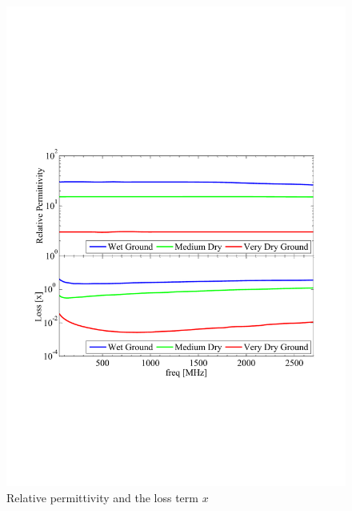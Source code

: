 \documentclass[10pt,journal,twoside]{IEEEtran}
\begin{document}
\begin{figure}
	\centering
	\includegraphics[width=\linewidth]{relative_permittivity_loss}%
	\caption{Relative permittivity and the loss term $x$}%
	\label{fig:complex_perm}
\end{figure}%
% 
\end{document}
